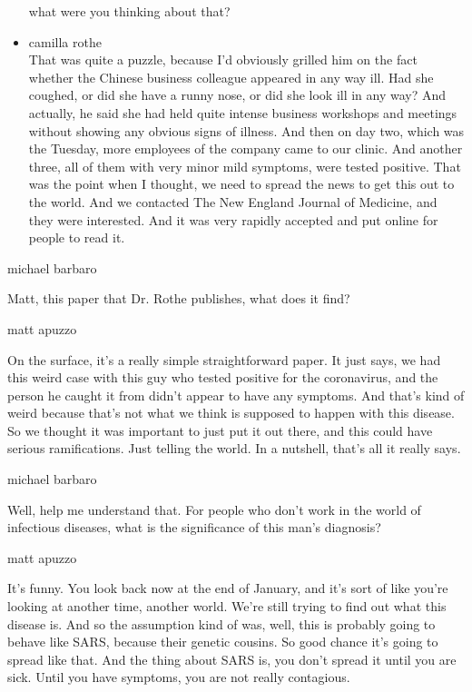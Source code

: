 \begin{itemize}
  what were you thinking about that?
\item
  camilla rothe\\
  That was quite a puzzle, because I'd obviously grilled him on the fact
  whether the Chinese business colleague appeared in any way ill. Had
  she coughed, or did she have a runny nose, or did she look ill in any
  way? And actually, he said she had held quite intense business
  workshops and meetings without showing any obvious signs of illness.
  And then on day two, which was the Tuesday, more employees of the
  company came to our clinic. And another three, all of them with very
  minor mild symptoms, were tested positive. That was the point when I
  thought, we need to spread the news to get this out to the world. And
  we contacted The New England Journal of Medicine, and they were
  interested. And it was very rapidly accepted and put online for people
  to read it.
\end{itemize}

michael barbaro

Matt, this paper that Dr. Rothe publishes, what does it find?

matt apuzzo

On the surface, it's a really simple straightforward paper. It just
says, we had this weird case with this guy who tested positive for the
coronavirus, and the person he caught it from didn't appear to have any
symptoms. And that's kind of weird because that's not what we think is
supposed to happen with this disease. So we thought it was important to
just put it out there, and this could have serious ramifications. Just
telling the world. In a nutshell, that's all it really says.

michael barbaro

Well, help me understand that. For people who don't work in the world of
infectious diseases, what is the significance of this man's diagnosis?

matt apuzzo

It's funny. You look back now at the end of January, and it's sort of
like you're looking at another time, another world. We're still trying
to find out what this disease is. And so the assumption kind of was,
well, this is probably going to behave like SARS, because their genetic
cousins. So good chance it's going to spread like that. And the thing
about SARS is, you don't spread it until you are sick. Until you have
symptoms, you are not really contagious.

